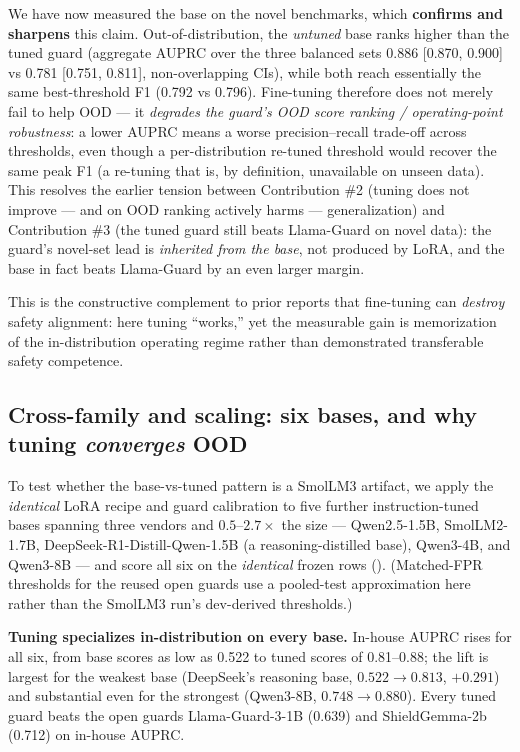 \documentclass[sigconf,nonacm]{acmart}
\begin{document}
We have now measured the base on the novel benchmarks, which \textbf{confirms and sharpens} this claim. Out-of-distribution, the \emph{untuned} base ranks higher than the tuned guard (aggregate AUPRC over the three balanced sets 0.886 [0.870, 0.900] vs 0.781 [0.751, 0.811], non-overlapping CIs), while both reach essentially the same best-threshold F1 (0.792 vs 0.796). Fine-tuning therefore does not merely fail to help OOD --- it \emph{degrades the guard's OOD score ranking / operating-point robustness}: a lower AUPRC means a worse precision--recall trade-off across thresholds, even though a per-distribution re-tuned threshold would recover the same peak F1 (a re-tuning that is, by definition, unavailable on unseen data). This resolves the earlier tension between Contribution \#2 (tuning does not improve --- and on OOD ranking actively harms --- generalization) and Contribution \#3 (the tuned guard still beats Llama-Guard on novel data): the guard's novel-set lead is \emph{inherited from the base}, not produced by LoRA, and the base in fact beats Llama-Guard by an even larger margin.

This is the constructive complement to prior reports that fine-tuning can \emph{destroy} safety alignment: here tuning ``works,'' yet the measurable gain is memorization of the in-distribution operating regime rather than demonstrated transferable safety competence.

\subsection{Cross-family and scaling: six bases, and why tuning \emph{converges} OOD}
\label{sec:cross-family}

To test whether the base-vs-tuned pattern is a SmolLM3 artifact, we apply the \emph{identical} LoRA recipe and guard calibration to five further instruction-tuned bases spanning three vendors and $0.5$--$2.7\times$ the size --- Qwen2.5-1.5B, SmolLM2-1.7B, DeepSeek-R1-Distill-Qwen-1.5B (a reasoning-distilled base), Qwen3-4B, and Qwen3-8B --- and score all six on the \emph{identical} frozen rows (). (Matched-FPR thresholds for the reused open guards use a pooled-test approximation here rather than the SmolLM3 run's dev-derived thresholds.)

\textbf{Tuning specializes in-distribution on every base.} In-house AUPRC rises for all six, from base scores as low as 0.522 to tuned scores of 0.81--0.88; the lift is largest for the weakest base (DeepSeek's reasoning base, $0.522\!\to\!0.813$, $+0.291$) and substantial even for the strongest (Qwen3-8B, $0.748\!\to\!0.880$). Every tuned guard beats the open guards Llama-Guard-3-1B (0.639) and ShieldGemma-2b (0.712) on in-house AUPRC.
\end{document}
